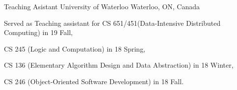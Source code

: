 

\begin{cventries}

   \cventry
    {Teaching Asistant} %
    {University of Waterloo} %
    {Waterloo, ON, Canada} %
    {} %
    {
      \begin{cvitems} %
      \item {Served as Teaching assistant for CS 651/451(Data-Intensive Distributed Computing) in 19 Fall, }
      \item {CS 245 (Logic and Computation) in 18 Spring,}
      \item {CS 136 (Elementary Algorithm Design and Data Abstraction) in 18 Winter,}
      \item {CS 246 (Object-Oriented Software Development) in 18 Fall.}
      \end{cvitems}
    }
\end{cventries}
